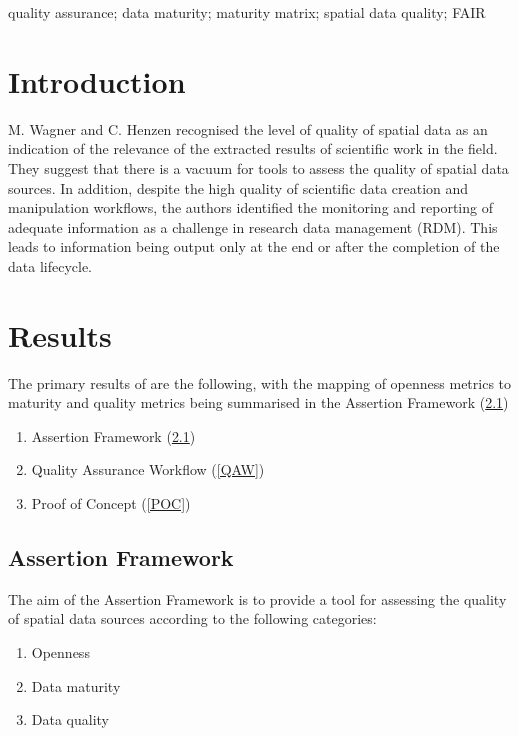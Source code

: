 \documentclass[conference]{IEEEtran}
\begin{document}
\begin{IEEEkeywords}
quality assurance; data maturity; maturity matrix; spatial data quality; FAIR
\end{IEEEkeywords}

\section{Introduction}
M. Wagner and C. Henzen recognised the level of quality of spatial data as an indication of the relevance of the extracted results of scientific work in the field. They suggest that there is a vacuum for tools to assess the quality of spatial data sources. In addition, despite the high quality of scientific data creation and manipulation workflows, the authors identified the monitoring and reporting of adequate information as a challenge in research data management (RDM). This leads to information being output only at the end or after the completion of the data lifecycle.

\section{Results}

The primary results of \cite{wagner2022quality} are the following, with the mapping of openness metrics to maturity and quality metrics being summarised in the Assertion Framework (\ref{AF})

\begin{enumerate}
    \item Assertion Framework (\ref{AF})
    \item Quality Assurance Workflow (\ref{QAW})
    \item Proof of Concept (\ref{POC})
\end{enumerate}

\subsection{Assertion Framework} \label{AF}

The aim of the Assertion Framework is to provide a tool for assessing the quality of spatial data sources according to the following categories:

\begin{enumerate}
    \item Openness
    \item Data maturity
    \item Data quality
\end{enumerate}
\end{document}
